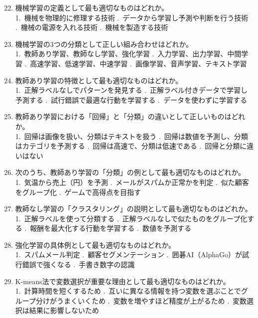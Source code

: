 \documentclass[b4paper,7pt,twocolumn,landscape]{jsarticle}
\begin{document}
\begin{enumerate}
\setcounter{enumi}{21}
\item 機械学習の定義として最も適切なものはどれか。\\
1.~機械を物理的に修理する技術 .~データから学習し予測や判断を行う技術 .~機械の電源を入れる技術 .~機械を製造する技術

\newpage

\item 機械学習の3つの分類として正しい組み合わせはどれか。\\
1.~教師あり学習、教師なし学習、強化学習 .~入力学習、出力学習、中間学習 .~高速学習、低速学習、中速学習 .~画像学習、音声学習、テキスト学習

\item 教師あり学習の特徴として最も適切なものはどれか。\\
1.~正解ラベルなしでパターンを発見する .~正解ラベル付きデータで学習し予測する .~試行錯誤で最適な行動を学習する .~データを使わずに学習する

\item 教師あり学習における「回帰」と「分類」の違いとして正しいものはどれか。\\
1.~回帰は画像を扱い、分類はテキストを扱う .~回帰は数値を予測し、分類はカテゴリを予測する .~回帰は高速で、分類は低速である .~回帰と分類に違いはない

\item 次のうち、教師あり学習の「分類」の例として最も適切なものはどれか。\\
1.~気温から売上（円）を予測 .~メールがスパムか正常かを判定 .~似た顧客をグループ化 .~ゲームで高得点を目指す

\item 教師なし学習の「クラスタリング」の説明として最も適切なものはどれか。\\
1.~正解ラベルを使って分類する .~正解ラベルなしで似たものをグループ化する .~報酬を最大化する行動を学習する .~数値を予測する

\item 強化学習の具体例として最も適切なものはどれか。\\
1.~スパムメール判定 .~顧客セグメンテーション .~囲碁AI（AlphaGo）が試行錯誤で強くなる .~手書き数字の認識

\item K-means法で変数選択が重要な理由として最も適切なものはどれか。\\
1.~計算時間を短くするため .~互いに異なる情報を持つ変数を選ぶことでグループ分けがうまくいくため .~変数を増やすほど精度が上がるため .~変数選択は結果に影響しないため
\end{enumerate}
\end{document}
